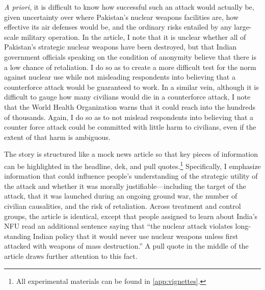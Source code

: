 \documentclass[12pt]{article}
\begin{document}
\textit{A priori}, it is difficult to know how successful such an attack would actually be, given uncertainty over where Pakistan's nuclear weapons facilities are, how effective its air defenses would be, and the ordinary risks entailed by any large-scale military operation. In the article, I note that it is unclear whether all of Pakistan's strategic nuclear weapons have been destroyed, but that Indian government officials speaking on the condition of anonymity believe that there is a low chance of retaliation. I do so as to create a more difficult test for the norm against nuclear use while not misleading respondents into believing that a counterforce attack would be guaranteed to work. In a similar vein, although it is difficult to gauge how many civilians would die in a counterforce attack, I note that the World Health Organization warns that it could reach into the hundreds of thousands. Again, I do so as to not mislead respondents into believing that a counter force attack could be committed with little harm to civilians, even if the extent of that harm is ambiguous.

The story is structured like a mock news article so that key pieces of information can be highlighted in the headline, dek, and pull quotes.\footnote{All experimental materials can be found in  \autoref{app:vignettes}.} Specifically, I emphasize information that could influence people's understanding of the strategic utility of the attack and whether it was morally justifiable—including the target of the attack, that it was launched during an ongoing ground war, the number of civilian causalities, and the risk of retaliation. Across treatment and control groups, the article is identical, except that people assigned to learn about India's NFU read an additional sentence saying that “the nuclear attack violates long-standing Indian policy that it would never use nuclear weapons unless first attacked with weapons of mass destruction.” A pull quote in the middle of the article draws further attention to this fact.
\end{document}
